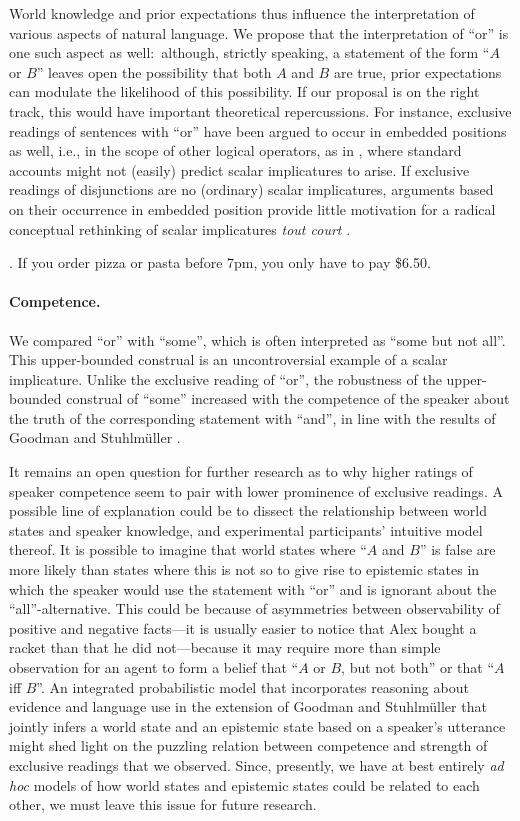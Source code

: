 \documentclass[12pt]{article}
\begin{document}
World knowledge and prior expectations thus influence the interpretation of various aspects of
natural language. We propose that the interpretation of ``or'' is one such aspect as well:\
although, strictly speaking, a statement of the form ``$A$ or $B$'' leaves open the possibility
that both $A$ and $B$ are true, prior expectations can modulate the likelihood of this
possibility. If our proposal is on the right track, this would have important theoretical
repercussions. For instance, exclusive readings of sentences with ``or'' have been argued to occur in
embedded positions as well, i.e., in the scope of other logical operators, as in \Next, where
standard accounts might not (easily) predict scalar implicatures to arise. If exclusive
readings of disjunctions are no (ordinary) scalar implicatures, arguments based on their
occurrence in embedded position provide little motivation for a radical conceptual rethinking of
scalar implicatures \emph{tout court} \citep[e.g.][]{chierchia2004,chierchia2012,fox2007}.

\ex. If you order pizza or pasta before 7pm, you only have to pay \$6.50.

\paragraph{Competence.} We compared ``or'' with ``some'', which is often interpreted as ``some but
not all''. This upper-bounded construal is an uncontroversial example of a scalar
implicature. Unlike the exclusive reading of ``or'', the robustness of the upper-bounded
construal of ``some'' increased with the competence of the speaker about the truth of the
corresponding statement with ``and'', in line with the results of Goodman and Stuhlm\"{u}ller
\citeyearpar{goodman2013}. 

It remains an open question for further research as to why higher ratings of speaker competence
seem to pair with lower prominence of exclusive readings. A possible line of explanation could
be to dissect the relationship between world states and speaker knowledge, and experimental
participants' intuitive model thereof. It is possible to imagine that world states where ``$A$
and $B$'' is false are more likely than states where this is not so to give rise to epistemic
states in which the speaker would use the statement with ``or'' and is ignorant about the
``all''-alternative. This could be because of asymmetries between observability of positive and
negative facts---it is usually easier to notice that Alex bought a racket than that he did not---because it may require more than simple observation for an agent to form a belief
that ``$A$ or $B$, but not both'' or that ``$A$ iff $B$''. An integrated probabilistic model that
incorporates reasoning about evidence and language use in the extension of Goodman and Stuhlm\"{u}ller  \citeyearpar{goodman2013}
that jointly infers a world state and an epistemic state based on a speaker's utterance might
shed light on the puzzling relation between competence and strength of exclusive
readings that we observed. Since, presently, we have at best entirely \emph{ad hoc} models of
how world states and epistemic states could be related to each other, we must leave this issue
for future research.
\end{document}
